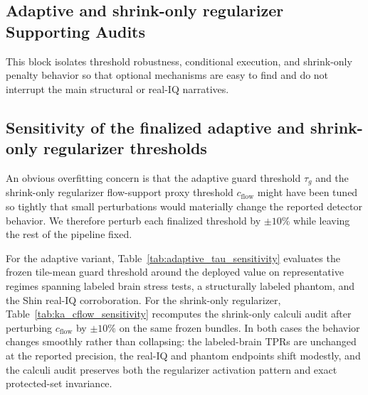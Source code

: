 \subsection*{Adaptive and shrink-only regularizer Supporting Audits}
This block isolates threshold robustness, conditional execution, and shrink-only penalty behavior so that optional mechanisms are easy to find and do not interrupt the main structural or real-IQ narratives.

\subsection{Sensitivity of the finalized adaptive and shrink-only regularizer thresholds}
\label{app:param-threshold-sensitivity}
An obvious overfitting concern is that the adaptive guard threshold $\tau_g$ and the shrink-only regularizer flow-support proxy threshold $c_{\mathrm{flow}}$ might have been tuned so tightly that small perturbations would materially change the reported detector behavior. We therefore perturb each finalized threshold by $\pm 10\%$ while leaving the rest of the pipeline fixed.

For the adaptive variant, Table~\ref{tab:adaptive_tau_sensitivity} evaluates the frozen tile-mean guard threshold around the deployed value on representative regimes spanning labeled brain stress tests, a structurally labeled phantom, and the Shin real-IQ corroboration. For the shrink-only regularizer, Table~\ref{tab:ka_cflow_sensitivity} recomputes the shrink-only calculi audit after perturbing $c_{\mathrm{flow}}$ by $\pm 10\%$ on the same frozen bundles. In both cases the behavior changes smoothly rather than collapsing: the labeled-brain TPRs are unchanged at the reported precision, the real-IQ and phantom endpoints shift modestly, and the calculi audit preserves both the regularizer activation pattern and exact protected-set invariance.


